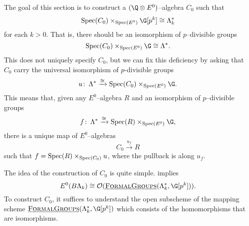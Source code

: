 The goal of this section is to construct a $(\Q \otimes E^0)$--algebra $C_0$ such that
\[
\Spec(C_0) \times_{\Spec(E^0)} \G[p^k] \cong \Lambda_{k}^*
\]
for each $k>0$. That is, there should be an isomorphism of $p$--divisible groups
\[
\Spec(C_0) \times_{\Spec(E^0)} \G \cong \Lambda^*.
\]
This does not uniquely specify $C_0$, but we can fix this deficiency by asking that $C_0$ carry the universal isomorphism of $p$-divisible groups 
\[
u \co \Lambda^* \xrightarrow{\cong} \Spec(C_0) \times_{\Spec(E^0)} \G.
\]
This means that, given any $E^0$--algebra $R$ and an isomorphism of $p$--divisible groups
\[
f \co \Lambda^* \xrightarrow{\cong} \Spec(R) \times_{\Spec(E^0)} \G,
\]
there is a unique map of $E^0$--algebras
\[
C_0 \xrightarrow{u_f} R
\]
such that $f = \operatorname{Spec}(R) \times_{\operatorname{Spec}(C_0)} u$, where the pullback is along $u_f$.

The idea of the construction of $C_0$ is quite simple.   implies \[E^0(B\Lk) \cong \sheaf O(\InternalHom{FormalGroups}(\Lk^*,\G[p^k])).\]  To construct $C_0$, it suffices to understand the open subscheme of the mapping scheme $\InternalHom{FormalGroups}(\Lk^*,\G[p^k])$ which consists of the homomorphisms that are isomorphisms. 

